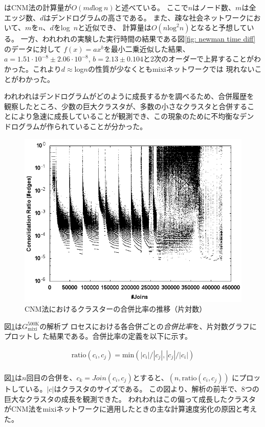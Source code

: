 \documentclass [a4j,11pt] {jsarticle}
\begin{document}
\cite{Clauset04}はCNM法の計算量が$O(md\text{log}~n)$と述べている。
ここで$n$はノード数、$m$は全エッジ数、$d$はデンドログラムの高さである。
また、疎な社会ネットワークにおいて、$m$を$n$、$d$をlog~$n$と近似でき、
計算量は$O(n\text{log}^2 n)$となると予想している。
一方、われわれの実験した実行時間の結果である図\ref{fig: newman time diff}のデータに対して
$f(x) = ax^b$を最小二乗近似した結果、$a = 1.51\cdot10^{-8} \pm2.06\cdot10^{-8}$,
$b = 2.13\pm0.104$と2次のオーダーで上昇することがわかった。これより$d\approx$log$n$の性質が少なくともmixiネットワークでは
現れないことがわかった。

われわれはデンドログラムがどのように成長するかを調べるため、合併履歴を
観察したところ、少数の巨大クラスタが、多数の小さなクラスタと合併するこ
とにより急速に成長していることが観測でき、この現象のために不均衡なデン
ドログラムが作られていることが分かった。

\begin {figure}[htbp]
  \centerline {\includegraphics [width=0.80\linewidth]{fig3-cnm-ratio-join.png}}
  \caption {CNM法におけるクラスターの合併比率の推移（片対数）}
  \label {fig: clauset ratio}
\end{figure}

図\ref {fig: clauset ratio}は$G_{\text {mixi}}^{\text {500K}}$の解析プ
ロセスにおける各合併ごとの\emph {合併比率}を、片対数グラフにプロットし
た結果である。合併比率の定義を以下に示す。

\begin {align*}
  \text{ratio}(c_i,c_j) = \text{min}(|c_i|/|c_j|,|c_j|/|c_i|) \\
\end {align*}

図\ref{fig: clauset ratio}は$n$回目の合併を、$c_k=Join(c_i,c_j)$とすると、$(n,\text{ratio}(c_i,c_j))$
にプロットしている。$|c|$はクラスタのサイズである。
この図より、解析の前半で、8つの巨大なクラスタの成長を観測できた。
われわれはこの偏って成長したクラスタがCNM法をmixiネットワークに適用したときの主な計算速度劣化の原因と考えた。
\end{document}
